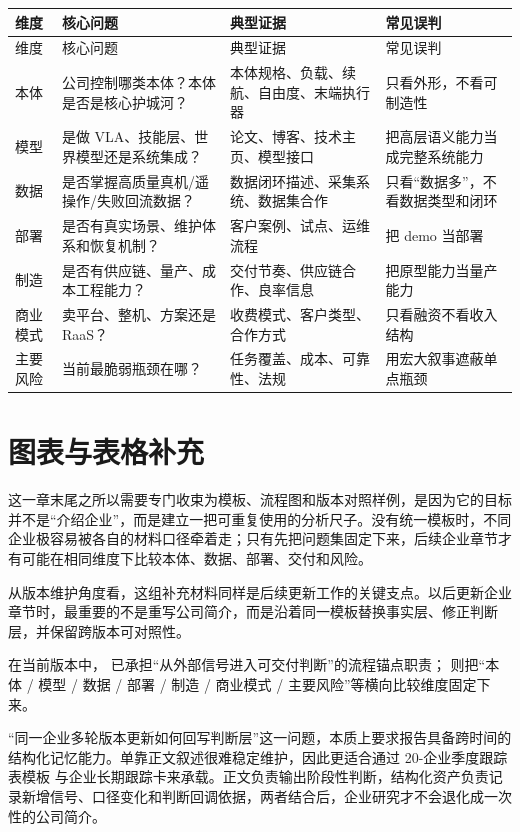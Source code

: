 \begingroup
\small
\begin{xltabular}{\textwidth}{YYYY}
\toprule
维度 & 核心问题 & 典型证据 & 常见误判 \\
\midrule
\endfirsthead
\toprule
维度 & 核心问题 & 典型证据 & 常见误判 \\
\midrule
\endhead
本体 & 公司控制哪类本体？本体是否是核心护城河？ & 本体规格、负载、续航、自由度、末端执行器 & 只看外形，不看可制造性 \\
模型 & 是做 VLA、技能层、世界模型还是系统集成？ & 论文、博客、技术主页、模型接口 & 把高层语义能力当成完整系统能力 \\
数据 & 是否掌握高质量真机/遥操作/失败回流数据？ & 数据闭环描述、采集系统、数据集合作 & 只看“数据多”，不看数据类型和闭环 \\
部署 & 是否有真实场景、维护体系和恢复机制？ & 客户案例、试点、运维流程 & 把 demo 当部署 \\
制造 & 是否有供应链、量产、成本工程能力？ & 交付节奏、供应链合作、良率信息 & 把原型能力当量产能力 \\
商业模式 & 卖平台、整机、方案还是 RaaS？ & 收费模式、客户类型、合作方式 & 只看融资不看收入结构 \\
主要风险 & 当前最脆弱瓶颈在哪？ & 任务覆盖、成本、可靠性、法规 & 用宏大叙事遮蔽单点瓶颈 \\
\bottomrule
\end{xltabular}
\endgroup

\section*{图表与表格补充}

这一章末尾之所以需要专门收束为模板、流程图和版本对照样例，是因为它的目标并不是“介绍企业”，而是建立一把可重复使用的分析尺子。没有统一模板时，不同企业极容易被各自的材料口径牵着走；只有先把问题集固定下来，后续企业章节才有可能在相同维度下比较本体、数据、部署、交付和风险。

从版本维护角度看，这组补充材料同样是后续更新工作的关键支点。以后更新企业章节时，最重要的不是重写公司简介，而是沿着同一模板替换事实层、修正判断层，并保留跨版本可对照性。

在当前版本中，\texttt{} 已承担“从外部信号进入可交付判断”的流程锚点职责；\texttt{} 则把“本体 / 模型 / 数据 / 部署 / 制造 / 商业模式 / 主要风险”等横向比较维度固定下来。

“同一企业多轮版本更新如何回写判断层”这一问题，本质上要求报告具备跨时间的结构化记忆能力。单靠正文叙述很难稳定维护，因此更适合通过 20-企业季度跟踪表模板 与企业长期跟踪卡来承载。正文负责输出阶段性判断，结构化资产负责记录新增信号、口径变化和判断回调依据，两者结合后，企业研究才不会退化成一次性的公司简介。

